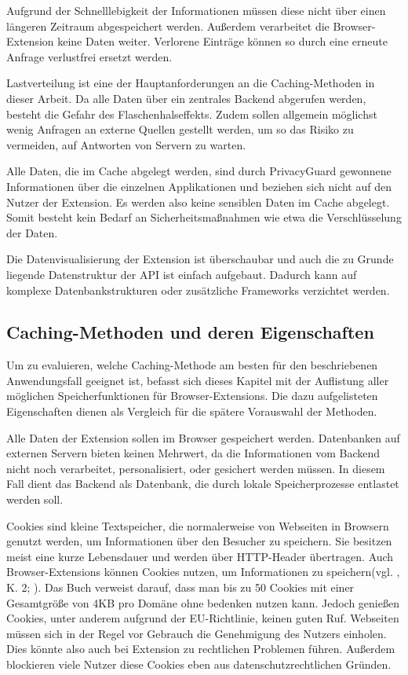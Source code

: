 Aufgrund der Schnelllebigkeit der Informationen müssen diese nicht über einen längeren Zeitraum abgespeichert werden. Außerdem verarbeitet die Browser-Extension keine Daten weiter. Verlorene Einträge können so durch eine erneute Anfrage verlustfrei ersetzt werden. 

Lastverteilung ist eine der Hauptanforderungen an die Caching-Methoden in dieser Arbeit. Da alle Daten über ein zentrales Backend abgerufen werden, besteht die Gefahr des Flaschenhalseffekts. Zudem sollen allgemein möglichst wenig Anfragen an externe Quellen gestellt werden, um so das Risiko zu vermeiden, auf Antworten von Servern zu warten.

Alle Daten, die im Cache abgelegt werden, sind durch PrivacyGuard gewonnene Informationen über die einzelnen Applikationen und beziehen sich nicht auf den Nutzer der Extension. Es werden also keine sensiblen Daten im Cache abgelegt. Somit besteht kein Bedarf an Sicherheitsmaßnahmen wie etwa die Verschlüsselung der Daten.

Die Datenvisualisierung der Extension ist überschaubar und auch die zu Grunde liegende Datenstruktur der API ist einfach aufgebaut. Dadurch kann auf komplexe Datenbankstrukturen oder zusätzliche Frameworks verzichtet werden.

\subsection{Caching-Methoden und deren Eigenschaften}
\label{ss:methodeneigenschaften}

Um zu evaluieren, welche Caching-Methode am besten für den beschriebenen Anwendungsfall geeignet ist, befasst sich dieses Kapitel mit der Auflistung aller möglichen Speicherfunktionen für Browser-Extensions. Die dazu aufgelisteten Eigenschaften dienen als Vergleich für die spätere Vorauswahl der Methoden.

Alle Daten der Extension sollen im Browser gespeichert werden. Datenbanken auf externen Servern bieten keinen Mehrwert, da die Informationen vom Backend nicht noch verarbeitet, personalisiert, oder gesichert werden müssen. In diesem Fall dient das Backend als Datenbank, die durch lokale Speicherprozesse entlastet werden soll.

Cookies sind kleine Textspeicher, die normalerweise von Webseiten in Browsern genutzt werden, um Informationen über den Besucher zu speichern. Sie besitzen meist eine kurze Lebensdauer und werden über HTTP-Header übertragen. Auch Browser-Extensions können Cookies nutzen, um Informationen zu speichern(vgl. \cite{local}, K. 2; \cite{cookies}). Das Buch verweist darauf, dass man bis zu 50 Cookies mit einer Gesamtgröße von 4KB pro Domäne ohne bedenken nutzen kann.
Jedoch genießen Cookies, unter anderem aufgrund der EU-Richtlinie\cite{richtlinie}, keinen guten Ruf. Webseiten müssen sich in der Regel vor Gebrauch die Genehmigung des Nutzers einholen. Dies könnte also auch bei Extension zu rechtlichen Problemen führen. Außerdem blockieren viele Nutzer diese Cookies eben aus datenschutzrechtlichen Gründen.

